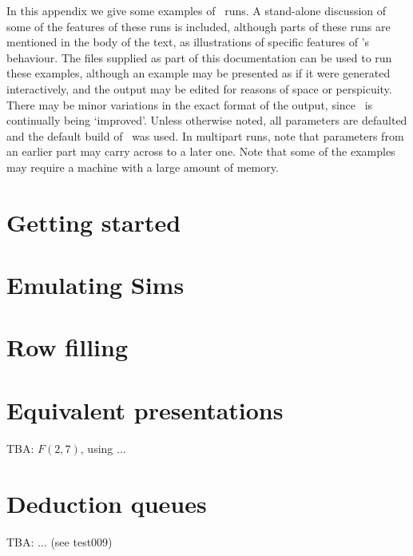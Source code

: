 
%
%

In this appendix we give some examples of \ace\ runs.
A stand-alone discussion of some of the features of these runs is included,
  although parts of these runs are mentioned in the body of the text, as 
  illustrations of specific features of \ace's behaviour.
The  files supplied as part of this documentation can be
  used to run these examples, although an example may be presented as if it
  were generated interactively, and the output may be edited for reasons of
  space or perspicuity.
There may be minor variations in the exact format of the output, since
  \ace\ is continually being `improved'\kern-1pt.
Unless otherwise noted, all parameters are defaulted and the default
  build of \ace\ was used.
In multipart runs, note that parameters from an earlier part may carry
  across to a later one.
Note that some of the examples may require a machine with a large amount
  of memory.

\section{Getting started}\label{ex000}


\section{Emulating Sims}\label{ex001}


\section{Row filling}\label{ex002}


\section{Equivalent presentations}

TBA: $F(2,7)$, using  \amp {} ...

\section{Deduction queues}

TBA: ... (see test009)

